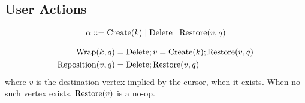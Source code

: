 
\subsection{User Actions}

\[
  \arraycolsep=0pt
  \begin{array}{llll}
    \alpha & {}::={} & \Create{k} \mid \Delete \mid \Restore{v, q} \\
  \end{array}
\]

\begin{align*}
  \Wrap{k, q} &= \Delete; v=\Create{k}; \Restore{v, q} \\
  \Reposition{v, q} &= \Delete; \Restore{v, q} \\
\end{align*}
%
where $v$ is the destination vertex implied by the cursor, when it exists.
When no such vertex exists, $\Restore{v}$ is a no-op.